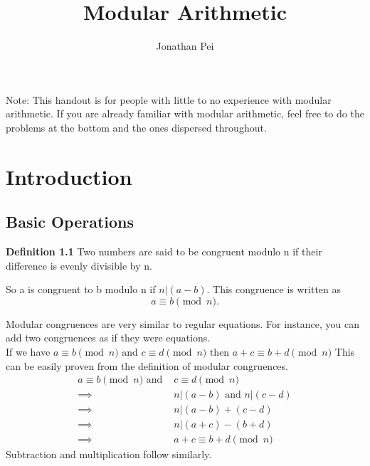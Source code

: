 \documentclass{article}
\begin{document}
\title{Modular Arithmetic}
\author{Jonathan Pei}
\maketitle
Note: This handout is for people with little to no experience with modular arithmetic. If you are already familiar with modular arithmetic, feel free to do the problems at the bottom and the ones dispersed throughout.

\section{Introduction}
\subsection*{Basic Operations}
\begin{mdframed}
\textbf{Definition 1.1} Two numbers are said to be congruent modulo n if their difference is evenly divisible by n.\\
\end{mdframed}
So a is congruent to b modulo n if $n | (a-b)$. 
This congruence is written as 
$$ a \equiv b \pmod{n}.$$

Modular congruences are very similar to regular equations. For instance, you can add two congruences as if they were equations.\\
If we have 
$
    a \equiv b \pmod{n} \text{ and } c \equiv d \pmod{n} \text{ then } a+c \equiv b+d \pmod{n}
$
This can be easily proven from the definition of modular congruences. 
\begin{align*}
    a \equiv b \pmod{n} \text{  and  } &c \equiv d \pmod{n}\\
    \implies &n|(a-b) \text{  and  } n|(c-d) \\
    \implies &n|(a-b)+(c-d)\\
    \implies &n|(a+c)-(b+d)\\
    \implies &\boxed{a+c \equiv b+d \pmod{n}}
\end{align*}
Subtraction and multiplication follow similarly.\\
\end{document}

